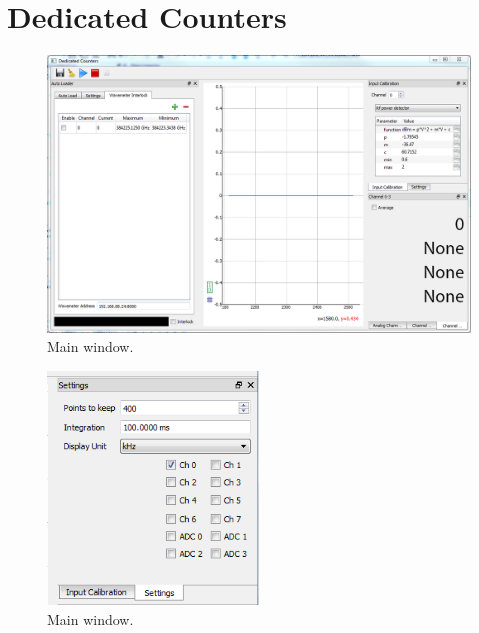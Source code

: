 \documentclass{scrartcl}
\begin{document}
\section{Dedicated Counters}
\begin{figure}[htbp]
\begin{center}
\includegraphics[width=\textwidth]{DedicatedCounters}
\end{center}
\caption{\label{DedicatedCounters} Main window.}
\end{figure}

\begin{figure}[htbp]
\begin{center}
\includegraphics[width=0.5\textwidth]{DedicatedCountersSettings}
\end{center}
\caption{\label{DedicatedCountersSettings} Main window.}
\end{figure}
\end{document}
